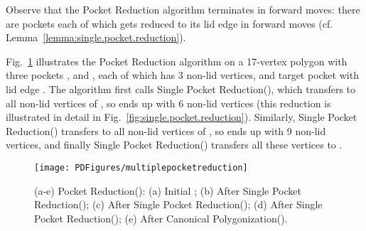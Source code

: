 \pdfoutput=1  \documentclass{article}
\newcommand{\figlab}[1]{\label{fig:#1}}
\newcommand{\lemref}[1]{\ref{lemma:#1}}
\newcommand{\figref}[1]{\ref{fig:#1}}
\begin{document}
\vspace{-0.2em}
\begin{center}
\vspace{1mm} \vspace{1mm}
\end{center}




\vspace{-0.2em} Observe that the {\sc Pocket Reduction} algorithm
terminates in  forward moves: there are  pockets 
each of which gets reduced to its lid edge in  forward moves
(cf. Lemma~\lemref{single.pocket.reduction}).

Fig.~\figref{manytoone.example} illustrates the {\sc Pocket
Reduction} algorithm on a 17-vertex polygon with three pockets ,
 and , 
each of which has 3 non-lid vertices,
and target pocket  with lid edge . 
The algorithm first
calls {\sc Single Pocket Reduction}(), which transfers to
 all non-lid vertices of , so  ends up with 6 non-lid
vertices (this reduction is illustrated in detail in
Fig.~\figref{single.pocket.reduction}). Similarly, {\sc Single
Pocket Reduction}() transfers to  all non-lid vertices
of , so  ends up with 9 non-lid vertices, and finally {\sc
Single Pocket Reduction}() transfers all these vertices
to .

\begin{figure}[htbp]
\centering
\texttt{[image: PDFigures/multiplepocketreduction]}
\vspace{-2em}\caption{(a-e) \small{{\sc Pocket Reduction}(): (a) Initial ; (b) After {\sc Single Pocket
Reduction}(); (c) After {\sc Single Pocket Reduction}(); (d) After {\sc Single Pocket Reduction}();
(e) After {\sc Canonical Polygonization}().}}
\figlab{manytoone.example}
\end{figure}
\end{document}
